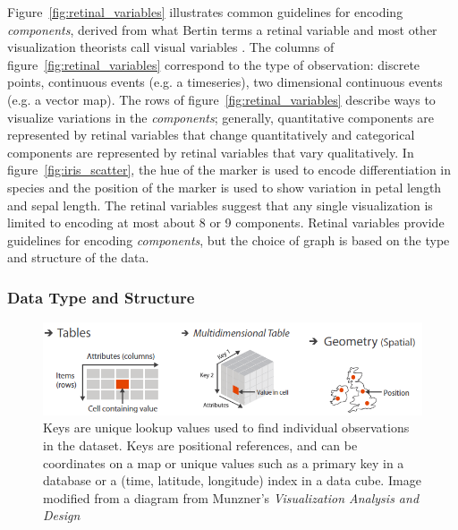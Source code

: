 \documentclass[../main.tex]{subfiles}
\begin{document}
Figure~\ref{fig:retinal_variables} illustrates common guidelines for encoding \textit{components}, derived from what Bertin terms a retinal variable and most other visualization theorists call visual variables \cite{bertin_semiology_2011,krygier_making_2005,chambers_graphical_1983,wilkinson_grammar_2005,munzner_visualization_2014}. The columns of figure~\ref{fig:retinal_variables} correspond to the type of observation: discrete points, continuous events (e.g. a timeseries), two dimensional continuous events (e.g. a vector map). The rows of figure~\ref{fig:retinal_variables} describe ways to visualize variations in the \textit{components}; generally, quantitative components are represented by retinal variables that change quantitatively and categorical components are represented by retinal variables that vary qualitatively. In figure~\ref{fig:iris_scatter}, the hue of the marker is used to encode differentiation in species and the position of the marker is used to show variation in petal length and sepal length. The retinal variables suggest that any single visualization is limited to encoding at most about 8 or 9 components. Retinal variables provide guidelines for encoding \textit{components}, but the choice of graph is based on the type and structure of the data. 

\subsubsection{Data Type and Structure}
\label{sec:intro_data_structure}
\begin{figure}[h!]
 \includegraphics[width=\textwidth]{figures/intro/munzner_datatypes}
\caption{Keys are unique lookup values used to find individual observations in the dataset. Keys are positional references, and can be coordinates on a map or unique values such as a primary key in a database or a (time, latitude, longitude) index in a data cube. Image modified from a diagram from Munzner's \textit{Visualization Analysis and Design} \cite{munznerVisualizationAnalysisDesign2014}}
\label{fig:munzner_datatypes}
\end{figure}
\end{document}
